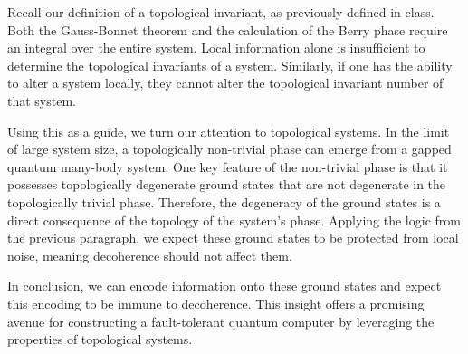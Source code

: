 \documentclass[11pt]{article}
\begin{document}
Recall our definition of a topological invariant, as previously defined in
class. Both the Gauss-Bonnet theorem and the calculation of the Berry phase
require an integral over the entire system. Local information alone is
insufficient to determine the topological invariants of a system. Similarly, if
one has the ability to alter a system locally, they cannot alter the topological
invariant number of that system.

Using this as a guide, we turn our attention to topological systems. In the
limit of large system size, a topologically non-trivial phase can emerge from a
gapped quantum many-body system. One key feature of the non-trivial phase is
that it possesses topologically degenerate ground states that are not degenerate
in the topologically trivial phase. Therefore, the degeneracy of the ground
states is a direct consequence of the topology of the system's phase. Applying
the logic from the previous paragraph, we expect these ground states to be
protected from local noise, meaning decoherence should not affect them.

In conclusion, we can encode information onto these ground states and expect
this encoding to be immune to decoherence. This insight offers a promising
avenue for constructing a fault-tolerant quantum computer by leveraging the
properties of topological systems.
\end{document}
